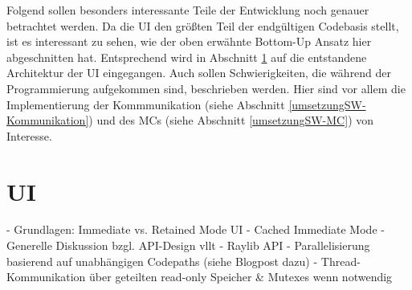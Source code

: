 
Folgend sollen besonders interessante Teile der Entwicklung noch genauer betrachtet werden.
Da die \ac{UI} den größten Teil der endgültigen Codebasis stellt, ist es interessant zu sehen, wie der oben erwähnte Bottom-Up Ansatz hier abgeschnitten hat.
Entsprechend wird in Abschnitt \ref{umsetzungSW-UI} auf die entstandene Architektur der \ac{UI} eingegangen.
Auch sollen Schwierigkeiten, die während der Programmierung aufgekommen sind, beschrieben werden.
Hier sind vor allem die Implementierung der Kommmunikation (siehe Abschnitt \ref{umsetzungSW-Kommunikation}) und des \ac{MC}s (siehe Abschnitt \ref{umsetzungSW-MC}) von Interesse.


\section{UI} \label{umsetzungSW-UI}
- Grundlagen: Immediate vs. Retained Mode UI \newline
- Cached Immediate Mode \newline
- Generelle Diskussion bzgl. API-Design vllt \newline
- Raylib API \newline
- Parallelisierung basierend auf unabhängigen Codepaths (siehe Blogpost dazu) \newline
- Thread-Kommunikation über geteilten read-only Speicher \& Mutexes wenn notwendig \newline


